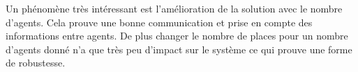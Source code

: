 Un phénomène très intéressant est l'amélioration de la solution avec le nombre d'agents. Cela prouve une bonne communication et prise en compte des informations entre agents. De plus changer le nombre de places pour un nombre d'agents donné n'a que très peu d'impact sur le système ce qui prouve une forme de robustesse.

\begin{figure}
  \begin{center}
    
    

\end{center}
\end{figure}
